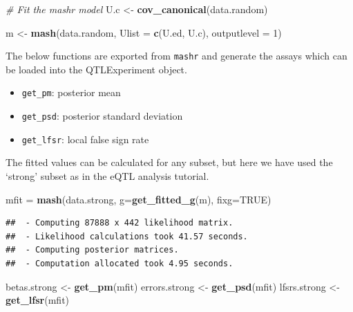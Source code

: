 \documentclass[
]{article}
\newenvironment{Shaded}{\begin{snugshade}}{\end{snugshade}}
\newcommand{\AttributeTok}[1]{\textcolor[rgb]{0.13,0.29,0.53}{#1}}
\newcommand{\CommentTok}[1]{\textcolor[rgb]{0.56,0.35,0.01}{\textit{#1}}}
\newcommand{\ConstantTok}[1]{\textcolor[rgb]{0.56,0.35,0.01}{#1}}
\newcommand{\DecValTok}[1]{\textcolor[rgb]{0.00,0.00,0.81}{#1}}
\newcommand{\FunctionTok}[1]{\textcolor[rgb]{0.13,0.29,0.53}{\textbf{#1}}}
\newcommand{\NormalTok}[1]{#1}
\newcommand{\OtherTok}[1]{\textcolor[rgb]{0.56,0.35,0.01}{#1}}
\providecommand{\tightlist}{%
  \setlength{\itemsep}{0pt}\setlength{\parskip}{0pt}}
\begin{document}
\footnotesize

\begin{Shaded}
\begin{Highlighting}[]
\CommentTok{\# Fit the mashr model }
\NormalTok{U.c }\OtherTok{\textless{}{-}} \FunctionTok{cov\_canonical}\NormalTok{(data.random)}

\NormalTok{m }\OtherTok{\textless{}{-}} \FunctionTok{mash}\NormalTok{(data.random, }\AttributeTok{Ulist =} \FunctionTok{c}\NormalTok{(U.ed, U.c), }\AttributeTok{outputlevel =} \DecValTok{1}\NormalTok{)}
\end{Highlighting}
\end{Shaded}

\normalsize

\footnotesize

\normalsize

The below functions are exported from \texttt{mashr} and generate the
assays which can be loaded into the QTLExperiment object.

\begin{itemize}
\tightlist
\item
  \texttt{get\_pm}: posterior mean
\item
  \texttt{get\_psd}: posterior standard deviation
\item
  \texttt{get\_lfsr}: local false sign rate
\end{itemize}

The fitted values can be calculated for any subset, but here we have
used the `strong' subset as in the eQTL analysis tutorial.

\footnotesize

\begin{Shaded}
\begin{Highlighting}[]
\NormalTok{mfit }\OtherTok{=} \FunctionTok{mash}\NormalTok{(data.strong, }\AttributeTok{g=}\FunctionTok{get\_fitted\_g}\NormalTok{(m), }\AttributeTok{fixg=}\ConstantTok{TRUE}\NormalTok{)}
\end{Highlighting}
\end{Shaded}

\begin{verbatim}
##  - Computing 87888 x 442 likelihood matrix.
##  - Likelihood calculations took 41.57 seconds.
##  - Computing posterior matrices.
##  - Computation allocated took 4.95 seconds.
\end{verbatim}

\begin{Shaded}
\begin{Highlighting}[]
\NormalTok{betas.strong }\OtherTok{\textless{}{-}} \FunctionTok{get\_pm}\NormalTok{(mfit)}
\NormalTok{errors.strong }\OtherTok{\textless{}{-}} \FunctionTok{get\_psd}\NormalTok{(mfit)}
\NormalTok{lfsrs.strong }\OtherTok{\textless{}{-}} \FunctionTok{get\_lfsr}\NormalTok{(mfit)}
\end{Highlighting}
\end{Shaded}
\end{document}
